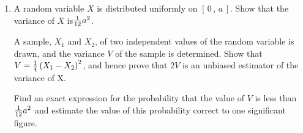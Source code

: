 \documentclass[a4, 11pt]{report}
\newlength{\qspace}
\newcounter{qnumber}
\newenvironment{question}%
 {\vspace{\qspace}
  \begin{enumerate}[\bfseries 1\quad][10]%
    \setcounter{enumi}{\value{qnumber}}%
    \item%
 }
{
  \end{enumerate}
  \filbreak
  \stepcounter{qnumber}
 }
\def\l{\left(}
\def\r{\right)}
\begin{document}
\begin{question}
A random variable $X$ is distributed uniformly on $[\, 0\, , \, a\,]$. 
Show that the variance of $X$ is\phantom{ }${1 \over 12} a^2$.

A sample, $X_1$ and $X_2$, of two independent values of the random
variable is drawn, and the variance $V$ of the sample is determined. Show that
$V = {1 \over 4} \l X_1 -X_2 \r ^2$, and hence prove that $2 V$ 
is an unbiased estimator of the variance of X.

Find an exact expression for the probability that the value of $V$ is less
than ${1 \over 12} a^2$ and estimate the value of this probability
correct to one significant figure.
\end{question}
	
\end{document}
